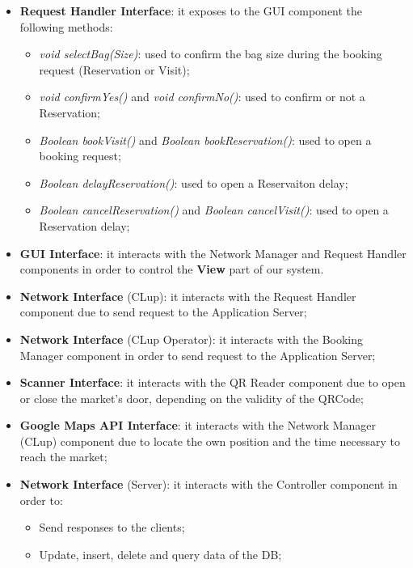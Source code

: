\begin{itemize}

\item \textbf{Request Handler Interface}: it exposes to the GUI component the following methods:
\begin{itemize}
\item \textit{void selectBag(Size)}: used to confirm the bag size during the booking request (Reservation or Visit);
\item \textit{void confirmYes()} and \textit{void confirmNo()}: used to confirm or not a Reservation;
\item \textit{Boolean bookVisit()} and \textit{Boolean bookReservation()}: used to open a booking request;
\item \textit{Boolean delayReservation()}: used to open a Reservaiton delay;
\item \textit{Boolean cancelReservation()} and \textit{Boolean cancelVisit()}: used to open a Reservation delay;
\end{itemize}

\item \textbf{GUI Interface}: it interacts with the Network Manager and Request Handler components in order to control the \textbf{View} part of our system. 

\item \textbf{Network Interface} (CLup): it interacts with the Request Handler component due to send request to the Application Server;

\item \textbf{Network Interface} (CLup Operator): it interacts with the Booking Manager component in order to send request to the Application Server;


\item \textbf{Scanner Interface}: it interacts with the QR Reader component due to open or close the market's door, depending on the validity of the QRCode;

\item \textbf{Google Maps API Interface}: it interacts with the Network Manager (CLup) component due to locate the own position and the time necessary to reach the market;


\item \textbf{Network Interface} (Server): it interacts with the Controller component in order to:
\begin{itemize}
\item Send responses to the clients;
\item Update, insert, delete and query data of the DB;
\end{itemize}


\end{itemize}
